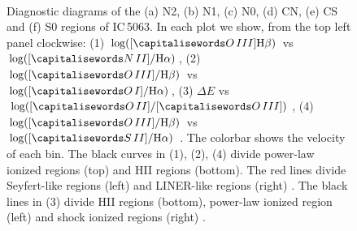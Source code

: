 \documentclass[../thesis.tex]{subfiles}
\begin{document}
\begin{figure}
\\
\caption[]{Diagnostic diagrams of the (a) N2, (b) N1, (c) N0, (d) CN, (e) CS and (f) S0 regions of IC\,5063.  In each plot we show, from the top left panel clockwise: (1) $\log([\ion{O}{III}] \Hb)$ vs $\log([\ion{N}{II}]/ \Ha)$, (2) $\log([\ion{O}{III}]/ \Hb)$ vs $\log([\ion{O}{I}]/ \Ha)$, (3) $\Delta E$ vs $\log([\ion{O}{II}]/[\ion{O}{III}])$, (4) $\log([\ion{O}{III}]/ \Hb)$ vs $\log([\ion{S}{II}]/ \Ha)$ \citep{Baldwin81, Veilleux87}. The colorbar shows the velocity of each bin. The black curves in (1), (2), (4) divide power-law ionized regions (top) and HII regions (bottom). The red lines divide Seyfert-like regions (left) and LINER-like regions (right) \citep{Kewley06}. The black lines in (3) divide HII regions (bottom), power-law ionized region (left) and shock ionized regions (right) \citep{Baldwin81}.  }
\label{fig:diag_css0}
\end{figure}
\end{document}
